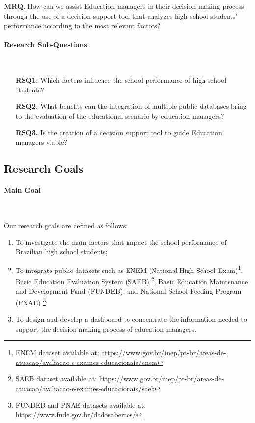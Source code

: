 \documentclass[12pt]{article}
\begin{document}
\textbf{MRQ.} How can we assist Education managers in their decision-making process through the use of a decision support tool that analyzes high school students' performance according to the most relevant factors?

\paragraph{Research Sub-Questions}\

\begin{itemize}
    \item[\textbf{RSQ1.}] Which factors influence the school performance of high school students?
\end{itemize}

\begin{itemize}
    \item[\textbf{RSQ2.}] What benefits can the integration of multiple public databases bring to the evaluation of the educational scenario by education managers?
\end{itemize}

\begin{itemize}
    \item[\textbf{RSQ3.}]  Is the creation of a decision support tool to guide Education managers viable?
\end{itemize}

\subsection{Research Goals}

\paragraph{Main Goal}\

Our research goals are defined as follows: 

\begin{enumerate}
    \item To investigate the main factors that impact the school performance of Brazilian high school students;
    \item To integrate public datasets such as ENEM (National High School Exam)\footnote{ENEM dataset available at: \url{https://www.gov.br/inep/pt-br/areas-de-atuacao/avaliacao-e-exames-educacionais/enem}}, Basic Education Evaluation System (SAEB) \footnote{SAEB dataset available at: \url{https://www.gov.br/inep/pt-br/areas-de-atuacao/avaliacao-e-exames-educacionais/saeb}}, Basic Education Maintenance and Development Fund (FUNDEB), and National School Feeding Program (PNAE) \footnote{FUNDEB and PNAE datasets available at: \url{https://www.fnde.gov.br/dadosabertos/}};
    
    \item To design and develop a dashboard to concentrate the information needed to support the decision-making process of education managers.
    
\end{enumerate}
\end{document}
